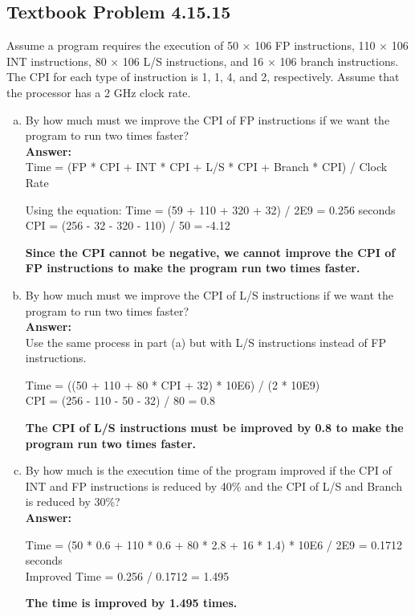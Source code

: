 \documentclass[12pt]{article}
\begin{document}
\subsection{Textbook Problem 4.15.15}
Assume a program requires the execution of 50 × 106 FP instructions, 110 × 106 INT instructions, 80 × 106 L/S instructions, and 16 × 106 branch instructions. The CPI for each type of instruction is 1, 1, 4, and 2, respectively. Assume that the processor has a 2 GHz clock rate.
\begin{enumerate}[(a)]
    \item By how much must we improve the CPI of FP instructions if we want the program to run two times faster?
    \\
    \textbf{Answer:}
    \\
    Time = (FP * CPI + INT * CPI + L/S * CPI + Branch * CPI) / Clock Rate
    \begin{center}
        Using the equation: 
        Time = (59 + 110 + 320 + 32) / 2E9 = 0.256 seconds\\[0.15in]
        CPI = (256 - 32 - 320 - 110) / 50 = -4.12
    \end{center}
    \textbf{Since the CPI cannot be negative, we cannot improve the CPI of FP instructions to make the program run two times faster.}
    
    \item By how much must we improve the CPI of L/S instructions if we want the program to run two times faster?
    \\
    \textbf{Answer:}
    \\
    Use the same process in part (a) but with L/S instructions instead of FP instructions.
    \begin{center}
        Time = ((50 + 110 + 80 * CPI + 32) * 10E6) / (2 * 10E9)\\[0.15in]
        CPI = (256 - 110 - 50 - 32) / 80 = 0.8
    \end{center}
    \textbf{The CPI of L/S instructions must be improved by 0.8 to make the program run two times faster.}
    
    \item By how much is the execution time of the program improved if the CPI of INT and FP instructions is reduced by 40\% and the CPI of L/S and Branch is reduced by 30\%?
    \\
    \textbf{Answer:}
    \\
    \begin{center}
        Time = (50 * 0.6 + 110 * 0.6 + 80 * 2.8 + 16 * 1.4) * 10E6 / 2E9 = 0.1712 seconds\\
        Improved Time = 0.256 / 0.1712 = 1.495 \\[0.25in]
    \end{center}
    \textbf{The time is improved by 1.495 times.}
\end{enumerate}
\end{document}
